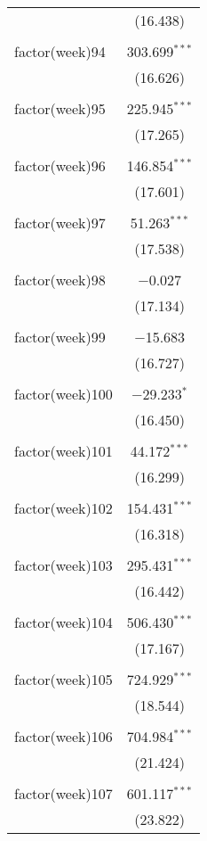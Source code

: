 \documentclass{article}
\begin{document}
\begin{table}[!htbp]
\begin{tabular}{@{\extracolsep{5pt}}lc}
  & (16.438) \\ 
  & \\ 
 factor(week)94 & 303.699$^{***}$ \\ 
  & (16.626) \\ 
  & \\ 
 factor(week)95 & 225.945$^{***}$ \\ 
  & (17.265) \\ 
  & \\ 
 factor(week)96 & 146.854$^{***}$ \\ 
  & (17.601) \\ 
  & \\ 
 factor(week)97 & 51.263$^{***}$ \\ 
  & (17.538) \\ 
  & \\ 
 factor(week)98 & $-$0.027 \\ 
  & (17.134) \\ 
  & \\ 
 factor(week)99 & $-$15.683 \\ 
  & (16.727) \\ 
  & \\ 
 factor(week)100 & $-$29.233$^{*}$ \\ 
  & (16.450) \\ 
  & \\ 
 factor(week)101 & 44.172$^{***}$ \\ 
  & (16.299) \\ 
  & \\ 
 factor(week)102 & 154.431$^{***}$ \\ 
  & (16.318) \\ 
  & \\ 
 factor(week)103 & 295.431$^{***}$ \\ 
  & (16.442) \\ 
  & \\ 
 factor(week)104 & 506.430$^{***}$ \\ 
  & (17.167) \\ 
  & \\ 
 factor(week)105 & 724.929$^{***}$ \\ 
  & (18.544) \\ 
  & \\ 
 factor(week)106 & 704.984$^{***}$ \\ 
  & (21.424) \\ 
  & \\ 
 factor(week)107 & 601.117$^{***}$ \\ 
  & (23.822) \\ 

\end{tabular}
\end{table}
\end{document}
